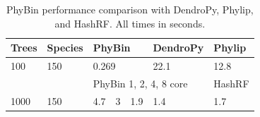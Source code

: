
\begin{table}
\begin{tabular}{| l | l | l | l | l | l | l |}
\hline
Trees     & Species    & \multicolumn{3}{|l|}{PhyBin} & DendroPy & Phylip \\ \hline
100       & 150        & \multicolumn{3}{|l|}{0.269}  & 22.1     & 12.8   \\ \hline
          &            & \multicolumn{4}{|l|}{PhyBin 1, 2, 4, 8 core} & HashRF \\ \hline
1000      & 150        & 4.7      & 3     & 1.9     & 1.4      & 1.7      \\ \hline
\end{tabular}
\caption{PhyBin performance comparison with DendroPy, Phylip, and HashRF.  All
  times in seconds.}
\label{t:phybin-bench}
\end{table}










